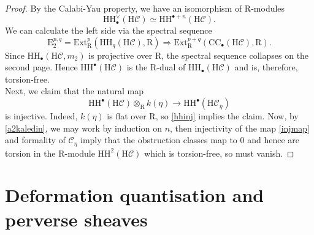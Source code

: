 \documentclass{article}
\theoremstyle{plain}
\theoremstyle{definition}
\theoremstyle{remark}
\newcommand{\mr}{\mathrm}
\newcommand{\Cc}{\mathcal C}
\newcommand{\3}{\vspace{3mm}}
\newcommand{\2}{\vspace{2mm}}
\newcommand{\1}{\vspace{1mm}}
\begin{document}
\begin{proof}
By the Calabi-Yau property, we have an isomorphism of $\mr{R}$-modules $$\mr{HH}_\bullet^\vee\left(\mr{H}\Cc\right)\simeq\mr{HH}^{\bullet+n}\left(\mr{H}\Cc\right).$$ We can calculate the left side via the spectral sequence $$\mr{E}_2^{p,q}=\mr{Ext}_{\mr{R}}^p\left(\mr{HH}_q\left(\mr{H}\Cc\right),\mr{R}\right)\Rightarrow \mr{Ext}^{p+q}_{\mr{R}}\left(\mr{CC}_\bullet\left(\mr{H}\Cc\right),\mr{R}\right).$$ Since $\mr{HH}_\bullet(\mr{H}\Cc,m_2)$ is projective over $\mr{R}$, the spectral sequence collapses on the second page. Hence $\mr{HH}^\bullet\left(\mr{H}\Cc\right)$ is the $\mr{R}$-dual of $\mr{HH}_\bullet\left(\mr{H}\Cc\right)$ and is, therefore, torsion-free.\\
Next, we claim that the natural map 
\begin{equation}\label{injmap}
\mr{HH}^\bullet\left(\mr{H}\Cc\right)\otimes_\mr{R} k(\eta) \to \mr{HH}^\bullet(\mr{H}\Cc_\eta)
\end{equation}is injective. Indeed, $k(\eta)$ is flat over $\mr{R}$, so \cref{hhinj} implies the claim. Now, by \cref{a2kaledin}, we may work by induction on $n$, then injectivity of the map \eqref{injmap} and formality of $\Cc_\eta$ imply that the obstruction classes map to $0$ and hence are torsion in the $\mr{R}$-module $\mr{HH}^2\left(\mr{H}\Cc\right)$ which is torsion-free, so must vanish.
\end{proof}


\section{Deformation quantisation and perverse sheaves}\label{sec2}
\end{document}

